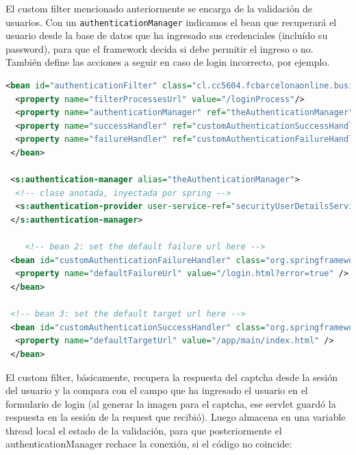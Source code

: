 \documentclass[letter]{article}
\begin{document}
El custom filter mencionado anteriormente se encarga de la validación de usuarios. Con un \texttt{authenticationManager} indicamos el bean que recuperará el usuario desde la base de datos que ha ingresado sus credenciales (incluído su password), para que el framework decida si debe permitir el ingreso o no. También define las acciones a seguir en caso de login incorrecto, por ejemplo.

\begin{lstlisting}[language=xml]
 <bean id="authenticationFilter" class="cl.cc5604.fcbarcelonaonline.business.application.ExUsernamePasswordAuthenticationFilter">
  <property name="filterProcessesUrl" value="/loginProcess"/>
  <property name="authenticationManager" ref="theAuthenticationManager"/>
  <property name="successHandler" ref="customAuthenticationSuccessHandler"/>
  <property name="failureHandler" ref="customAuthenticationFailureHandler"/>
 </bean>

 <s:authentication-manager alias="theAuthenticationManager">
  <!-- clase anotada, inyectada por spring -->
  <s:authentication-provider user-service-ref="securityUserDetailsService"/>
 </s:authentication-manager>

    <!-- bean 2: set the default failure url here -->
 <bean id="customAuthenticationFailureHandler" class="org.springframework.security.web.authentication.SimpleUrlAuthenticationFailureHandler">
  <property name="defaultFailureUrl" value="/login.html?error=true" />
 </bean>

 <!-- bean 3: set the default target url here -->
 <bean id="customAuthenticationSuccessHandler" class="org.springframework.security.web.authentication.SimpleUrlAuthenticationSuccessHandler">
  <property name="defaultTargetUrl" value="/app/main/index.html" />
 </bean>
\end{lstlisting}
El custom filter, básicamente, recupera la respuesta del captcha desde la sesión del usuario y la compara con el campo que ha ingresado el usuario en el formulario de login (al generar la imagen para el captcha, ese servlet guardó la respuesta en la sesión de la request que recibió). Luego almacena en una variable thread local el estado de la validación, para que posteriormente el authenticationManager rechace la conexión, si el código no coincide:
\end{document}
